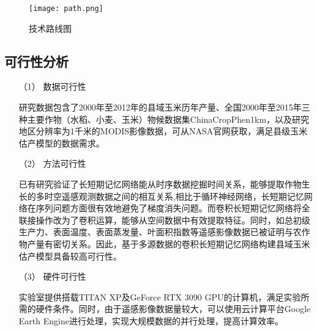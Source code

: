 \begin{figure}
  \begin{center}
    \texttt{[image: path.png]}
    \caption{技术路线图}
    \label{Fig_path}
  \end{center}
\end{figure}

\subsection{可行性分析}
\begin{itemize}
  \item [（1）] 数据可行性
  \par 研究数据包含了2000年至2012年的县域玉米历年产量、全国2000年至2015年三种主要作物（水稻、小麦、玉米）物候数据集ChinaCropPhen1km，以及研究地区分辨率为1千米的MODIS影像数据，可从NASA官网获取，满足县级玉米估产模型的数据需求。
  \item [（2）] 方法可行性
  \par 已有研究验证了长短期记忆网络能从时序数据挖掘时间关系，能够提取作物生长的多时空遥感观测数据之间的相互关系,相比于循环神经网络，长短期记忆网络在序列问题方面很有效地避免了梯度消失问题。而卷积长短期记忆网络将全联接操作改为了卷积运算，能够从空间数据中有效提取特征。同时，如总初级生产力、表面温度、表面蒸发量、叶面积指数等遥感影像数据已被证明与农作物产量有密切关系。因此，基于多源数据的卷积长短期记忆网络构建县域玉米估产模型具备较高可行性。
  \item [（3）] 硬件可行性
  \par 实验室提供搭载TITAN XP及GeForce RTX 3090 GPU的计算机，满足实验所需的硬件条件。同时，由于遥感影像数据量较大，可以使用云计算平台Google Earth Engine进行处理，实现大规模数据的并行处理，提高计算效率。
\end{itemize}
